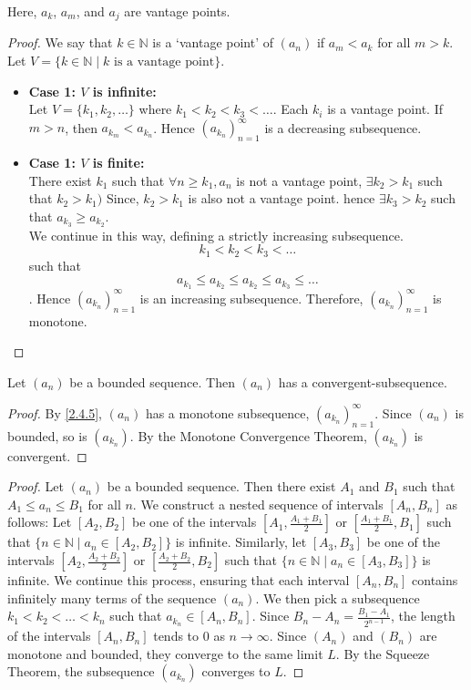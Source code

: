\documentclass[11pt]{article}
\begin{document}
Here, \(a_k\), \(a_m\), and \(a_j\) are vantage points.

\begin{proof}
	We say that \(k \in \mathbb{N}\) is a `vantage point' of \((a_n)\) if \(a_m < a_k\) for all \(m > k\). Let \(V = \{k \in \mathbb{N} \mid k \text{ is a vantage point}\}\).
	\begin{itemize}
		\item \textbf{Case 1: \(V\) is infinite:} \\ Let \(V = \{k_1, k_2, \ldots \}\) where \(k_1 < k_2 < k_3 < \ldots\). Each \(k_i\) is a vantage point. If \(m > n\), then \(a_{{k_m}} < a_{k_n}\). Hence \((a_{k_n})_{n=1}^\infty\) is a decreasing subsequence.
		\item \textbf{Case 1: \(V\) is finite:} \\ There exist \(k_1\) such that \(\forall n \geq k_1, a_n\) is not a vantage point, \(\exists k_2 > k_1\) such that \(k_2 > k_1)\) Since, \(k_2 > k_1\) is also not a vantage point. hence \(\exists k_3 > k_2\) such that \(a_{k_3} \geq a_{k_2}\).\\ We continue in this way, defining a strictly increasing subsequence. \[k_1 < k_2 < k_3 < \ldots\] such that \[a_{k_1} \leq a_{k_2} \leq a_{k_2} \leq a_{k_3} \leq \ldots\]. Hence \((a_{k_n})_{n=1}^\infty\) is an increasing subsequence. Therefore, \((a_{k_n})_{n=1}^\infty\) is monotone.

	\end{itemize}
\end{proof}

\begin{theorem}\label{2.4.6}
	Let \((a_n)\) be a bounded sequence. Then \((a_n)\) has a convergent-subsequence.
\end{theorem}
\begin{proof}
	By \cref{2.4.5}, \((a_n)\) has a monotone subsequence, \((a_{k_n})_{n=1}^\infty\). Since \((a_n)\) is bounded, so is \((a_{k_n})\). By the Monotone Convergence Theorem, \((a_{k_n})\) is convergent.
\end{proof}
\begin{proof}
	Let $(a_n)$ be a bounded sequence. Then there exist $A_1$ and $B_1$ such that $A_1 \leq a_n \leq B_1$ for all $n$. We construct a nested sequence of intervals $[A_n, B_n]$ as follows: Let $[A_2, B_2]$ be one of the intervals $[A_1, \frac{A_1 + B_1}{2}]$ or $[\frac{A_1 + B_1}{2}, B_1]$ such that $\{n \in \mathbb{N} \mid a_n \in [A_2, B_2]\}$ is infinite. Similarly, let $[A_3, B_3]$ be one of the intervals $[A_2, \frac{A_2 + B_2}{2}]$ or $[\frac{A_2 + B_2}{2}, B_2]$ such that $\{n \in \mathbb{N} \mid a_n \in [A_3, B_3]\}$ is infinite. We continue this process, ensuring that each interval $[A_n, B_n]$ contains infinitely many terms of the sequence $(a_n)$. We then pick a subsequence $k_1 < k_2 < \ldots < k_n$ such that $a_{k_n} \in [A_n, B_n]$. Since $B_n - A_n = \frac{B_1 - A_1}{2^{n-1}}$, the length of the intervals $[A_n, B_n]$ tends to $0$ as $n \to \infty$. Since $(A_n)$ and $(B_n)$ are monotone and bounded, they converge to the same limit $L$. By the Squeeze Theorem, the subsequence $(a_{k_n})$ converges to $L$.
\end{proof}
\end{document}
